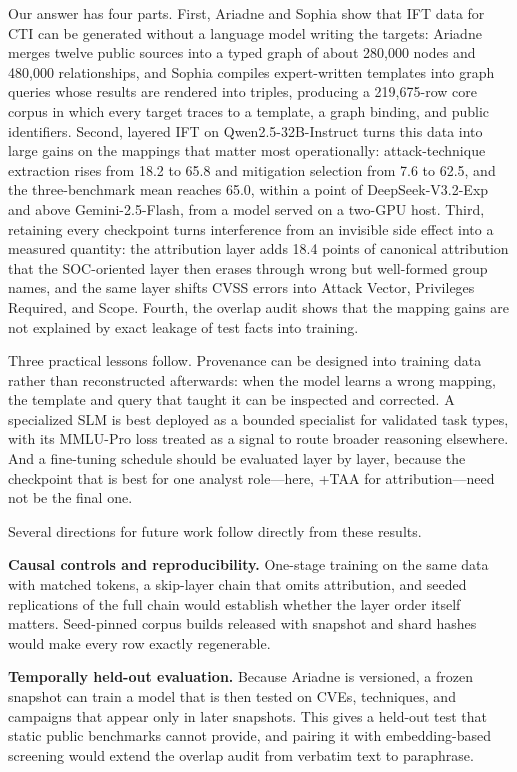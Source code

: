 \documentclass[conference]{IEEEtran}
\begin{document}
Our answer has four parts. First, Ariadne and Sophia show that IFT data for CTI can be generated without a language model writing the targets: Ariadne merges twelve public sources into a typed graph of about 280,000 nodes and 480,000 relationships, and Sophia compiles expert-written templates into graph queries whose results are rendered into triples, producing a 219,675-row core corpus in which every target traces to a template, a graph binding, and public identifiers. Second, layered IFT on Qwen2.5-32B-Instruct turns this data into large gains on the mappings that matter most operationally: attack-technique extraction rises from 18.2 to 65.8 and mitigation selection from 7.6 to 62.5, and the three-benchmark mean reaches 65.0, within a point of DeepSeek-V3.2-Exp and above Gemini-2.5-Flash, from a model served on a two-GPU host. Third, retaining every checkpoint turns interference from an invisible side effect into a measured quantity: the attribution layer adds 18.4 points of canonical attribution that the SOC-oriented layer then erases through wrong but well-formed group names, and the same layer shifts CVSS errors into Attack Vector, Privileges Required, and Scope. Fourth, the overlap audit shows that the mapping gains are not explained by exact leakage of test facts into training.

Three practical lessons follow. Provenance can be designed into training data rather than reconstructed afterwards: when the model learns a wrong mapping, the template and query that taught it can be inspected and corrected. A specialized SLM is best deployed as a bounded specialist for validated task types, with its MMLU-Pro loss treated as a signal to route broader reasoning elsewhere. And a fine-tuning schedule should be evaluated layer by layer, because the checkpoint that is best for one analyst role---here, +TAA for attribution---need not be the final one.

Several directions for future work follow directly from these results.

\textbf{Causal controls and reproducibility.} One-stage training on the same data with matched tokens, a skip-layer chain that omits attribution, and seeded replications of the full chain would establish whether the layer order itself matters. Seed-pinned corpus builds released with snapshot and shard hashes would make every row exactly regenerable.

\textbf{Temporally held-out evaluation.} Because Ariadne is versioned, a frozen snapshot can train a model that is then tested on CVEs, techniques, and campaigns that appear only in later snapshots. This gives a held-out test that static public benchmarks cannot provide, and pairing it with embedding-based screening would extend the overlap audit from verbatim text to paraphrase.
\end{document}
